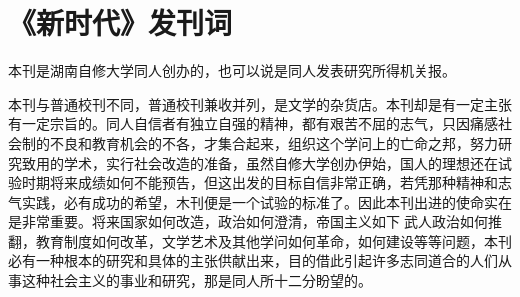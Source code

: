 \section[《新时代》发刊词（一九二三年）]{《新时代》发刊词}


本刊是湖南自修大学同人创办的，也可以说是同人发表研究所得机关报。

本刊与普通校刊不同，普通校刊兼收并列，是文学的杂货店。本刊却是有一定主张有一定宗旨的。同人自信者有独立自强的精神，都有艰苦不屈的志气，只因痛感社会制的不良和教育机会的不各，才集合起来，组织这个学问上的亡命之邦，努力研究致用的学术，实行社会改造的准备，虽然自修大学创办伊始，国人的理想还在试验时期将来成绩如何不能预告，但这出发的目标自信非常正确，若凭那种精神和志气实践，必有成功的希望，木刊便是一个试验的标准了。因此本刊出进的使命实在是非常重要。将来国家如何改造，政治如何澄清，帝国主义如下武人政治如何推翻，教育制度如何改革，文学艺术及其他学问如何革命，如何建设等等问题，本刊必有一种根本的研究和具体的主张供献出来，目的借此引起许多志同道合的人们从事这种社会主义的事业和研究，那是同人所十二分盼望的。

